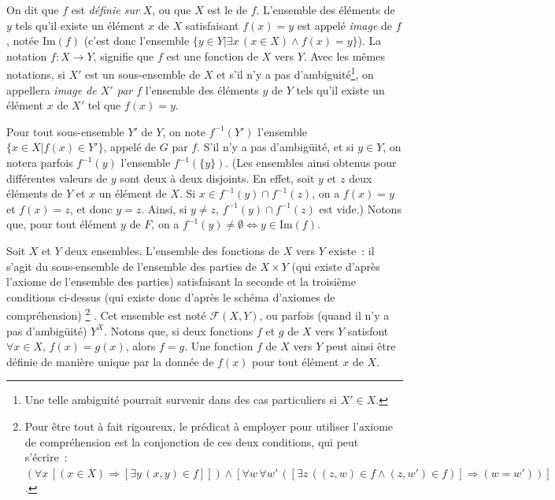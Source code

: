 On dit que $f$ est \emph{définie sur} $X$, ou que $X$ est le \emph{} de $f$. 
L'ensemble des éléments de $y$ tels qu'il existe un élément $x$ de $X$ satisfaisant $f(x) = y$ est appelé \emph{image} de $f$, notée $\mathrm{Im}(f)$ (c'est donc l'ensemble $\lbrace y \in Y \vert \exists x \, (x \in X) \wedge f(x) = y \rbrace$). 
La notation $f: X \to Y$, signifie que $f$ est une fonction de $X$ vers $Y$. 
Avec les mêmes notations, si $X'$ est un sous-ensemble de $X$ et s'il n'y a pas d'ambiguité\footnote{Une telle ambiguité pourrait survenir dans des cas particuliers si $X' \in X$.}, on appellera \emph{image de $X'$ par $f$} l'ensemble des éléments $y$ de $Y$ tels qu'il existe un élément $x$ de $X'$ tel que $f(x) = y$.

Pour tout sous-ensemble $Y'$ de $Y$, on note $f^{-1}(Y')$ l'ensemble $\lbrace x \in X \vert f(x) \in Y' \rbrace$, appelé \emph{} de $G$ par $f$. 
S'il n'y a pas d'ambigüité, et si $y \in Y$, on notera parfois $f^{-1}(y)$ l'ensemble $f^{-1}(\lbrace y \rbrace)$.
(Les ensembles ainsi obtenus pour différentes valeurs de $y$ sont deux à deux disjoints. 
En effet, soit $y$ et $z$ deux éléments de $Y$ et $x$ un élément de $X$. 
Si $x \in f^{-1}(y) \cap f^{-1}(z)$, on a $f(x) = y$ et $f(x) = z$, et donc $y = z$. 
Ainsi, si $y \neq z$, $f^{-1}(y) \cap f^{-1}(z)$ est vide.)
Notons que, pour tout élément $y$ de $F$, on a $f^{-1}(y) \neq \emptyset \Leftrightarrow y \in \mathrm{Im}(f)$. 

Soit $X$ et $Y$ deux ensembles. 
L'ensemble des fonctions de $X$ vers $Y$ existe : il s'agit du sous-ensemble de l'ensemble des parties de $X \times Y$ (qui existe d'après l'axiome de l'ensemble des parties) satisfaisant la seconde et la troisième conditions ci-dessus (qui existe donc d'après le schéma d'axiomes de compréhension)%
\footnote{Pour être tout à fait rigoureux, le prédicat à employer pour utiliser l'axiome de compréhension est la conjonction de ces deux conditions, qui peut s'écrire : $(\forall x \, [(x \in X) \Rightarrow [\exists y \, (x,y) \in f]]) \wedge [\forall w \, \forall w' \, ([\exists z \, ((z,w) \in f \wedge (z,w') \in f)] \Rightarrow (w = w'))]$.}%
. 
Cet ensemble est noté $\mathcal{F}(X,Y)$, ou parfois (quand il n'y a pas d'ambigüité) $Y^X$. 
Notons que, si deux fonctions $f$ et $g$ de $X$ vers $Y$ satisfont $\forall x \in X, \, f(x) = g(x)$, alors $f = g$. 
Une fonction $f$ de $X$ vers $Y$ peut ainsi être définie de manière unique par la donnée de $f(x)$ pour tout élément $x$ de $X$.

